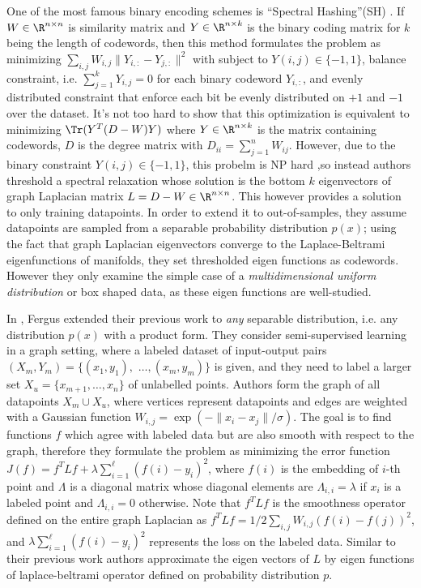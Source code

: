 \documentclass{sig-alternate}
\begin{document}
One of the most famous binary encoding schemes is ``Spectral Hashing''(SH) \cite{weiss2009spectral}. If $W \in \R^{n \times n}$ is similarity matrix and $Y \in \R^{n \times k}$ is the binary coding matrix for $k$ being the length of codewords, then this method 
formulates the problem as minimizing $\sum_{i,j} W_{i,j} \| Y_{i,:} - Y_{j,:} \|^2$ with subject to $Y(i,j) \in \{-1, 1 \}$, balance constraint, i.e. $\sum_{j=1}^k Y_{i,j} = 0$ for each binary codeword $Y_{i,:}$, and evenly distributed constraint that enforce each bit be evenly distributed on $+1$ and $-1$ over the dataset.
It's not too hard to show that this optimization is equivalent to minimizing $\Tr(Y^T(D-W)Y)$ where $Y \in \R^{n\times k}$ is the matrix containing codewords, $D$ is the degree matrix with $D_{ii} = \sum_{j=1}^n W_{ij}$. 
However, due to the binary constraint $Y(i,j) \in \{-1, 1 \}$, this probelm is NP hard ,so instead authors threshold a spectral
relaxation whose solution is the bottom $k$ eigenvectors of graph Laplacian matrix $L = D-W \in \R^{n \times n}$. 
This however provides a solution to only training datapoints. In order to extend it to out-of-samples, they assume datapoints are sampled from a separable probability distribution $p(x)$; using the fact that graph Laplacian eigenvectors converge to the Laplace-Beltrami eigenfunctions of manifolds, they set thresholded eigen functions as codewords. However they only examine the simple case of a \textit{multidimensional uniform distribution} or box shaped data, as these eigen functions are well-studied. 

In \cite{fergus2009semi}, Fergus \etal extended their previous work\cite{weiss2009spectral} to \textit{any} separable distribution, i.e. any distribution $p(x)$ with a product form.
They consider semi-supervised learning in a graph setting, where a labeled dataset of input-output pairs $(X_{m},Y_m) = \{(x_1,y_1),$
$\ldots, (x_m,y_m)\}$ is given, and they need to label a larger set $X_u = \{x_{m+1},\ldots,x_n\}$ of unlabelled points.
Authors form the graph of all datapoints $X_m \cup X_u$, where vertices represent datapoints and edges are weighted with a Gaussian function $W_{i,j} = \exp(- \|x_i - x_j\|/\sigma)$. 
The goal is to find functions $f$ which agree with labeled data but are also smooth with respect to the graph, therefore they formulate the problem as minimizing the error function $J(f) = f^TLf +  \lambda \sum_{i=1}^{\ell}(f(i)-y_i)^2$, where $f(i)$ is the embedding of $i$-th point and $\Lambda$ is a diagonal matrix whose diagonal elements are
$\Lambda_{i,i} = \lambda$ if $x_i$ is a labeled point and $\Lambda_{i,i} = 0$ otherwise.
Note that $f^TLf$ is the smoothness operator defined on the entire graph Laplacian as $f^TLf = 1/2 \sum_{i,j}W_{i,j}(f(i)-f(j))^2$, and $\lambda \sum_{i=1}^{\ell}(f(i)-y_i)^2$ represents the loss on the labeled data.
Similar to their previous work\cite{weiss2009spectral} authors approximate the eigen vectors of $L$ by eigen functions
of laplace-beltrami operator defined on probability distribution $p$.
\end{document}
